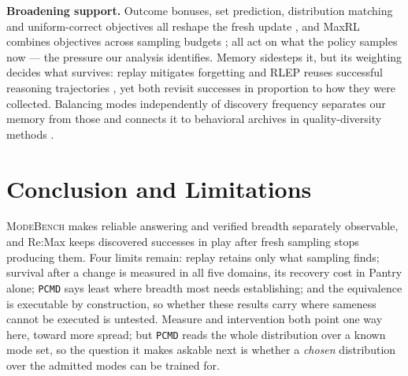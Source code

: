 \documentclass{article}
\newcommand{\1}{\mathbf 1}
\newcommand{\mb}{\textsc{ModeBench}}
\newcommand{\pmd}{\texttt{PCMD}}
\theoremstyle{remark}
\theoremstyle{definition}
\theoremstyle{plain}
\begin{document}
\textbf{Broadening support.} Outcome bonuses, set prediction, distribution
matching and uniform-correct objectives all reshape the fresh update
\citep{song2025outcome,chen2025passktraining,li2025divergence,li2026setpo,li2026distribution,lochab2026ucpo,anschel2025groupaware,chen2026diverse},
and MaxRL combines objectives across sampling budgets \citep{tajwar2026maxrl};
all act on what the policy samples now --- the pressure our analysis
identifies. Memory sidesteps it, but its weighting decides what survives:
replay mitigates forgetting
\citep{lin1992selfimproving,rolnick2019replay} and RLEP reuses successful
reasoning trajectories \citep{zhang2025rlep}, yet both revisit successes in
proportion to how they were collected. Balancing modes independently of
discovery frequency separates our memory from those and connects it to
behavioral archives in quality-diversity methods
\citep{mouret2015illuminating,ecoffet2021return}.

\section{Conclusion and Limitations}
\label{sec:conclusion}
\label{sec:discussion}
\label{sec:limitations}

\mb{} makes reliable answering and verified breadth separately observable, and
Re:Max keeps discovered successes in play after fresh sampling stops
producing them. Four limits remain: replay retains only what sampling finds;
survival after a change is measured in all five domains, its recovery cost in
Pantry alone; \pmd{} says least where breadth most needs
establishing; and the equivalence is executable by construction, so whether
these results carry where sameness cannot be executed is untested. Measure and intervention both point one way here,
toward more spread; but \pmd{} reads the whole distribution over a known mode
set, so the question it makes askable next is whether a \emph{chosen}
distribution over the admitted modes can be trained for.

\label{sec:main-end}

\clearpage
{}\label{sec:references}


\end{document}
